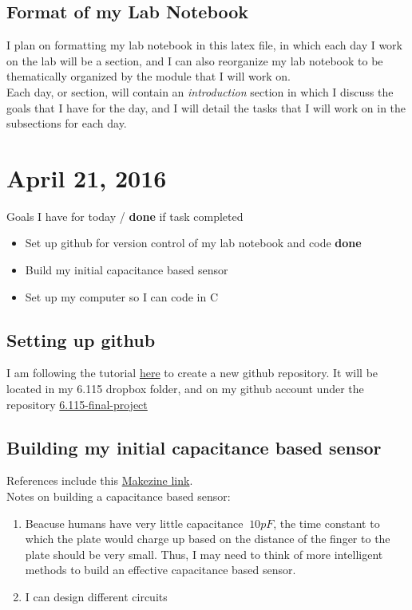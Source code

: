 \documentclass[12pt,twoside]{article}
\begin{document}
\subsection{Format of my Lab Notebook}
I plan on formatting my lab notebook in this latex file, in which each day I work on the lab will be a section, and I can also reorganize my lab notebook to be thematically organized by the module that I will work on. 
\\ Each day, or section, will contain an {\em introduction} section in which I discuss the goals that I have for the day, and I will detail the tasks that I will work on in the subsections for each day. 

\newpage
\section{April 21, 2016}
Goals I have for today / {\bf done} if task completed
\begin{itemize}
\item Set up github for version control of my lab notebook and code {\bf done}
\item Build my initial capacitance based sensor
\item Set up my computer so I can code in C
\end{itemize}

\subsection{Setting up github}
I am following the tutorial \href{https://help.github.com/articles/adding-an-existing-project-to-github-using-the-command-line/}{here} to create a new github repository. It will be located in my 6.115 dropbox folder, and on my github account under the repository \href{https://github.com/qandrew/6.115-final-project}{6.115-final-project}

\subsection{Building my initial capacitance based sensor}
References include this \href{http://makezine.com/projects/a-touchless-3d-tracking-interface/}{Makezine link}. 
\\ Notes on building a capacitance based sensor:
\begin{enumerate}%
\item Beacuse humans have very little capacitance $~ 10 pF$, the time constant to which the plate would charge up based on the distance of the finger to the plate should be very small. Thus, I may need to think of more intelligent methods to build an effective capacitance based sensor. 
\item I can design different circuits
\end{enumerate}
\end{document}
